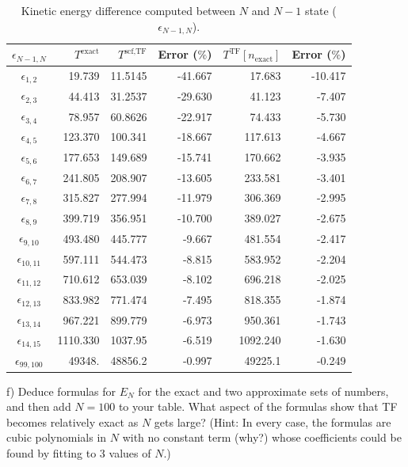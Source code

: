 \documentclass{article}
\begin{document}
\begin{table}[H]
  \caption{Kinetic energy difference computed between $N$ and $N-1$ state
    ($\epsilon_{N-1,N}$).}
  \centering
  \begin{tabular}{crrrrr}
    $\epsilon_{N-1,N}$ & $T^{\text{exact}}$ & $T^{\text{scf,TF}}$ &
    Error ($\%$) & $T^{\text{TF}}[n_{\text{exact}}]$ & Error ($\%$) \\
    \hline
     $\epsilon_{1,2}$&  19.739 & 11.5145 & -41.667 & 17.683 & -10.417 \\
     $\epsilon_{2,3}$&  44.413 & 31.2537 & -29.630 & 41.123 & -7.407 \\
     $\epsilon_{3,4}$&  78.957 & 60.8626 & -22.917 & 74.433 & -5.730 \\
     $\epsilon_{4,5}$&  123.370 & 100.341 & -18.667 & 117.613 & -4.667 \\
     $\epsilon_{5,6}$&  177.653 & 149.689 & -15.741 & 170.662 & -3.935 \\
     $\epsilon_{6,7}$&  241.805 & 208.907 & -13.605 & 233.581 & -3.401 \\
     $\epsilon_{7,8}$&  315.827 & 277.994 & -11.979 & 306.369 & -2.995 \\
     $\epsilon_{8,9}$&  399.719 & 356.951 & -10.700 & 389.027 & -2.675 \\
     $\epsilon_{9,10}$&  493.480 & 445.777 & -9.667 & 481.554 & -2.417 \\
     $\epsilon_{10,11}$&  597.111 & 544.473 & -8.815 & 583.952 & -2.204 \\
     $\epsilon_{11,12}$&  710.612 & 653.039 & -8.102 & 696.218 & -2.025 \\
     $\epsilon_{12,13}$&  833.982 & 771.474 & -7.495 & 818.355 & -1.874 \\
     $\epsilon_{13,14}$&  967.221 & 899.779 & -6.973 & 950.361 & -1.743 \\
     $\epsilon_{14,15}$&  1110.330 & 1037.95 & -6.519 & 1092.240 & -1.630 \\
     $\epsilon_{99,100}$& 49348. & 48856.2 & -0.997 & 49225.1 & -0.249
  \end{tabular}
\end{table}

\noindent f) Deduce formulas for $E_N$ for the exact and two approximate sets
of numbers, and then add $N=100$ to your table.   What aspect of the formulas
show that TF becomes relatively exact as $N$ gets large?  (Hint:  In every case,
the formulas are cubic polynomials in $N$ with no constant term (why?) whose
coefficients could be found by fitting to 3 values of $N$.)
\end{document}
